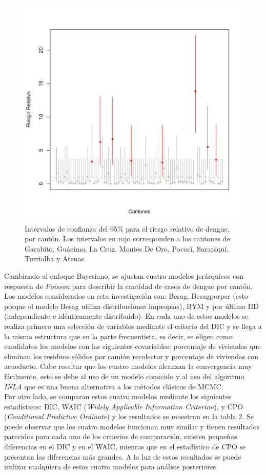 \documentclass[a4paper,12pt]{report}
\begin{document}
\begin{figure}[t]
\centering
\includegraphics[scale=0.46]{F6.pdf}
\caption{Intervalos de confianza del 95\% para el riesgo relativo de dengue, por cantón. Los intervalos en rojo corresponden a los cantones de: Garabito, Guácimo, La Cruz, Montes De Oro, Pococí, Sarapiquí, Turrialba y Atenas}
\end{figure}

Cambiando al enfoque Bayesiano, se ajustan cuatro modelos jerárquicos con respuesta de \textit{Poisson} para describir la cantidad de casos de dengue por cantón. Los modelos considerados en esta investigación son: Besag, Besagporper (esto porque el modelo Besag utiliza distribuciones impropias), BYM y por último IID (independiente e idénticamente distribuido). En cada uno de estos modelos se realiza primero una selección de variables mediante el criterio del DIC y se llega a la misma estructura que en la parte frecuentista, es decir, se eligen como candidatos los modelos con las siguientes covariables: porcentaje de viviendas que eliminan los residuos sólidos por camión recolector y porcentaje de viviendas con acueducto. Cabe resaltar que los cuatro modelos alcanzan la convergencia muy fácilmente, esto se debe al uso de un modelo conocido y al uso del algoritmo \textit{INLA} que es una buena alternativa a los métodos clásicos de MCMC.\\
 Por otro lado, se comparan estos cuatro modelos mediante los siguientes estadísticos: DIC, WAIC (\textit{Widely Applicable Information Criterion}), y CPO (\textit{Conditional Predictive Ordinate}) y los resultados se muestran en la tabla 2. Se puede observar que los cuatro modelos funcionan muy similar y tienen resultados parecidos para cada uno de los criterios de comparación, existen pequeñas diferencias en el DIC y en el WAIC, mienras que en el estadístico de CPO se presentan las diferencias más grandes. A la luz de estos resultados se puede utilizar cualquiera de estos cuatro modelos para análisis posteriores.
\end{document}
